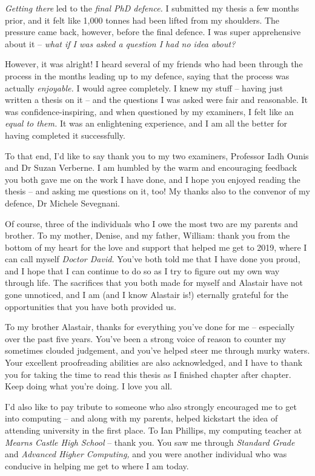 \begin{preamble}
\emph{Getting there} led to the \emph{final PhD defence.} I submitted my thesis a few months prior, and it felt like 1,000 tonnes had been lifted from my shoulders. The pressure came back, however, before the final defence. I was super apprehensive about it -- \emph{what if I was asked a question I had no idea about?}

However, it was alright! I heard several of my friends who had been through the process in the months leading up to my defence, saying that the process was actually \emph{enjoyable.} I would agree completely. I knew my stuff -- having just written a thesis on it -- and the questions I was asked were fair and reasonable. It was confidence-inspiring, and when questioned by my examiners, I felt like an \emph{equal to them.} It was an enlightening experience, and I am all the better for having completed it successfully.

To that end, I'd like to say thank you to my two examiners, Professor Iadh Ounis and Dr Suzan Verberne. I am humbled by the warm and encouraging feedback you both gave me on the work I have done, and I hope you enjoyed reading the thesis -- and asking me questions on it, too! My thanks also to the convenor of my defence, Dr Michele Sevegnani.

Of course, three of the individuals who I owe the most two are my parents and brother. To my mother, Denise, and my father, William: thank you from the bottom of my heart for the love and support that helped me get to 2019, where I can call myself \emph{Doctor David.} You've both told me that I have done you proud, and I hope that I can continue to do so as I try to figure out my own way through life. The sacrifices that you both made for myself and Alastair have not gone unnoticed, and I am (and I know Alastair is!) eternally grateful for the opportunities that you have both provided us.

To my brother Alastair, thanks for everything you've done for me -- especially over the past five years. You've been a strong voice of reason to counter my sometimes clouded judgement, and you've helped steer me through murky waters. Your excellent proofreading abilities are also acknowledged, and I have to thank you for taking the time to read this thesis as I finished chapter after chapter. Keep doing what you're doing. I love you all.

I'd also like to pay tribute to someone who also strongly encouraged me to get into computing -- and along with my parents, helped kickstart the idea of attending university in the first place. To Ian Phillips, my computing teacher at \emph{Mearns Castle High School} -- thank you. You saw me through \emph{Standard Grade} and \emph{Advanced Higher Computing,} and you were another individual who was conducive in helping me get to where I am today.


\end{preamble}
